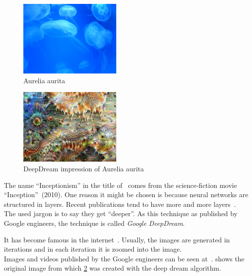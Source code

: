 \begin{figure}[ht]
    \centering
    \includegraphics[width=0.45\textwidth]{figures/DeepDream/Aurelia-aurita-3/Aurelia-aurita-3.jpg}
    \caption{Aurelia aurita}
    \label{fig:Aurelia-aurita-3-original}
\end{figure}

\begin{figure}[ht]
    \centering
    \includegraphics[width=0.45\textwidth]{figures/DeepDream/Aurelia-aurita-3/0099.jpg}
    \caption{DeepDream impression of Aurelia aurita}
    \label{fig:Aurelia-aurita-3-100}
\end{figure}

The name \enquote{Inceptionism} in the title of~\cite{inceptionism2015} comes
from the science-fiction movie \enquote{Inception}~(2010). One reason it might
be chosen is because neural networks are structured in layers. Recent
publications tend to have more and more layers~\cite{he2015deep}. The used
jargon is to say they get \enquote{deeper}. As this technique as published by
Google engineers, the technique is called \textit{Google DeepDream}.

It has become famous in the internet~\cite{RedditDeepDream}. Usually, the
images are generated in iterations and in each iteration it is zoomed into the
image.\\
Images and videos published by the Google engineers can be seen
at~\cite{googlePhotos2015}.  shows the
original image from which \cref{fig:Aurelia-aurita-3-100} was created with the
deep dream algorithm.




